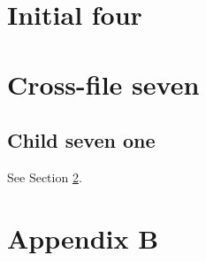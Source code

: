 \documentclass{article}
\begin{document}
\tableofcontents
\section{Initial four}\label{sec:four}

\section{Cross-file seven}\label{sec:seven}
\subsection{Child seven one}
See Section \ref{sec:seven}.
\appendix
\setcounter{section}{1}
\section{Appendix B}
\end{document}
